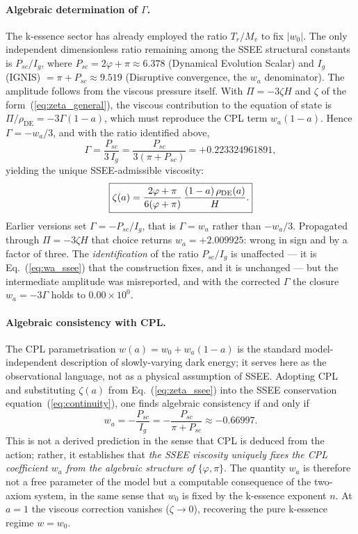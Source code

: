 \paragraph{Algebraic determination of $\Gamma$.}
The k-essence sector has already employed the ratio $T_r/M_v$ to fix
$|w_0|$.  The only independent dimensionless ratio remaining among the
SSEE structural constants is $P_{sc}/I_g$, where
$P_{sc} = 2\varphi+\pi\approx6.378$ (Dynamical Evolution Scalar) and
$I_g$ (IGNIS) $= \pi+P_{sc}\approx9.519$ (Disruptive convergence, the $w_a$ denominator).
The amplitude follows from the viscous pressure itself.  With
$\Pi = -3\zeta H$ and $\zeta$ of the form~(\ref{eq:zeta_general}), the
viscous contribution to the equation of state is $\Pi/\rho_{\mathrm{DE}} =
-3\Gamma(1-a)$, which must reproduce the CPL term $w_a(1-a)$.  Hence
$\Gamma = -w_a/3$, and with the ratio identified above,
%
\begin{equation}
  \Gamma = \frac{P_{sc}}{3\,I_g} = \frac{P_{sc}}{3(\pi+P_{sc})}
         = +0.223324961891,
  \label{eq:Gamma_ssee}
\end{equation}
%
yielding the unique SSEE-admissible viscosity:
%
\begin{equation}
  \boxed{%
    \zeta(a)
      = \frac{2\varphi+\pi}{6(\varphi+\pi)}\,
        \frac{(1-a)\,\rho_{\mathrm{DE}}(a)}{H}.}
  \label{eq:zeta_ssee}
\end{equation}
%
Earlier versions set $\Gamma = -P_{sc}/I_g$, that is $\Gamma = w_a$ rather
than $-w_a/3$.  Propagated through $\Pi = -3\zeta H$ that choice returns
$w_a = +2.009925$: wrong in sign and by a factor of three.  The
\emph{identification} of the ratio $P_{sc}/I_g$ is unaffected --- it is
Eq.~(\ref{eq:wa_ssee}) that the construction fixes, and it is unchanged ---
but the intermediate amplitude was misreported, and with the corrected
$\Gamma$ the closure $w_a = -3\Gamma$ holds to $0.00\times10^{0}$.

\paragraph{Algebraic consistency with CPL.}
The CPL parametrisation $w(a) = w_0 + w_a(1-a)$ is the standard
model-independent description of slowly-varying dark energy; it serves here as
the observational language, not as a physical assumption of SSEE.  Adopting CPL
and substituting $\zeta(a)$ from Eq.~(\ref{eq:zeta_ssee}) into the SSEE
conservation equation~(\ref{eq:continuity}), one finds algebraic consistency
if and only if
%
\begin{equation}
  \boxed{w_a = -\frac{P_{sc}}{I_g} = -\frac{P_{sc}}{\pi+P_{sc}} \approx -0.66997.}
  \label{eq:wa_ssee}
\end{equation}
%
This is not a derived prediction in the sense that CPL is deduced from the
action; rather, it establishes that \emph{the SSEE viscosity uniquely fixes
the CPL coefficient $w_a$ from the algebraic structure of $\{\varphi,\pi\}$}.
The quantity $w_a$ is therefore not a free parameter of the model but a
computable consequence of the two-axiom system, in the same sense that $w_0$
is fixed by the k-essence exponent $n$.  At $a=1$ the viscous correction
vanishes ($\zeta\to 0$), recovering the pure k-essence regime $w = w_0$.

